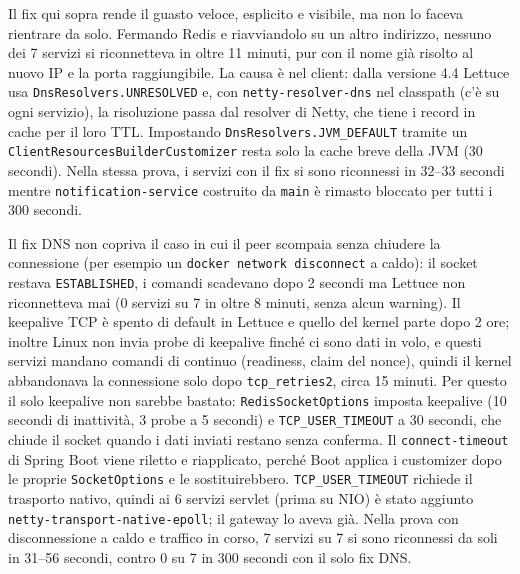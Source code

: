 ﻿\documentclass[a4paper,12pt]{report}
\begin{document}
\begin{notebox}[title={Seguito --- riconnessione dopo un cambio di IP di Redis (risolto)}]
Il fix qui sopra rende il guasto veloce, esplicito e visibile, ma non lo faceva
rientrare da solo. Fermando Redis e riavviandolo su un altro indirizzo, nessuno
dei 7 servizi si riconnetteva in oltre 11 minuti, pur con il nome gi\`a risolto
al nuovo IP e la porta raggiungibile. La causa \`e nel client: dalla versione
4.4 Lettuce usa \texttt{DnsResolvers.UNRESOLVED} e, con
\texttt{netty-resolver-dns} nel classpath (c'\`e su ogni servizio), la
risoluzione passa dal resolver di Netty, che tiene i record in cache per il
loro TTL. Impostando \texttt{DnsResolvers.JVM\_DEFAULT} tramite un
\texttt{ClientResourcesBuilderCustomizer} resta solo la cache breve della JVM
(30 secondi). Nella stessa prova, i servizi con il fix si sono riconnessi in
32--33 secondi mentre \texttt{notification-service} costruito da \texttt{main}
\`e rimasto bloccato per tutti i 300 secondi.
\end{notebox}

\begin{notebox}[title={Seguito --- connessioni mezze aperte (risolto)}]
Il fix DNS non copriva il caso in cui il peer scompaia senza chiudere la
connessione (per esempio un \texttt{docker network disconnect} a caldo): il
socket restava \texttt{ESTABLISHED}, i comandi scadevano dopo 2 secondi ma
Lettuce non riconnetteva mai (0 servizi su 7 in oltre 8 minuti, senza alcun
warning). Il keepalive TCP \`e spento di default in Lettuce e quello del kernel
parte dopo 2 ore; inoltre Linux non invia probe di keepalive finch\'e ci sono
dati in volo, e questi servizi mandano comandi di continuo (readiness, claim del
nonce), quindi il kernel abbandonava la connessione solo dopo
\texttt{tcp\_retries2}, circa 15 minuti. Per questo il solo keepalive non
sarebbe bastato: \texttt{RedisSocketOptions} imposta keepalive (10 secondi di
inattivit\`a, 3 probe a 5 secondi) e \texttt{TCP\_USER\_TIMEOUT} a 30 secondi,
che chiude il socket quando i dati inviati restano senza conferma. Il
\texttt{connect-timeout} di Spring Boot viene riletto e riapplicato, perch\'e
Boot applica i customizer dopo le proprie \texttt{SocketOptions} e le
sostituirebbero. \texttt{TCP\_USER\_TIMEOUT} richiede il trasporto nativo,
quindi ai 6 servizi servlet (prima su NIO) \`e stato aggiunto
\texttt{netty-transport-native-epoll}; il gateway lo aveva gi\`a. Nella prova
con disconnessione a caldo e traffico in corso, 7 servizi su 7 si sono
riconnessi da soli in 31--56 secondi, contro 0 su 7 in 300 secondi con il solo
fix DNS.
\end{notebox}
\end{document}

